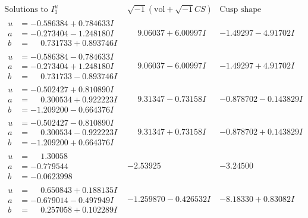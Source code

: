 \documentclass[1p]{elsarticle_modified}
\theoremstyle{definition}
\newcommand{\I}{\sqrt{-1}}
\begin{document}
$$\begin{array}{c|c|c}  
\text{Solutions to }I^u_{1}& \I (\text{vol} + \sqrt{-1}CS) & \text{Cusp shape}\\
 \hline 
\begin{aligned}
u &= -0.586384 + 0.784633 I \\
a &= -0.273404 - 1.248180 I \\
b &= \phantom{-}0.731733 + 0.893746 I\end{aligned}
 & \phantom{-}9.06037 + 6.00997 I & -1.49297 - 4.91702 I \\ \hline\begin{aligned}
u &= -0.586384 - 0.784633 I \\
a &= -0.273404 + 1.248180 I \\
b &= \phantom{-}0.731733 - 0.893746 I\end{aligned}
 & \phantom{-}9.06037 - 6.00997 I & -1.49297 + 4.91702 I \\ \hline\begin{aligned}
u &= -0.502427 + 0.810890 I \\
a &= \phantom{-}0.300534 + 0.922223 I \\
b &= -1.209200 - 0.664376 I\end{aligned}
 & \phantom{-}9.31347 - 0.73158 I & -0.878702 - 0.143829 I \\ \hline\begin{aligned}
u &= -0.502427 - 0.810890 I \\
a &= \phantom{-}0.300534 - 0.922223 I \\
b &= -1.209200 + 0.664376 I\end{aligned}
 & \phantom{-}9.31347 + 0.73158 I & -0.878702 + 0.143829 I \\ \hline\begin{aligned}
u &= \phantom{-}1.30058\phantom{ +0.000000I} \\
a &= -0.779544\phantom{ +0.000000I} \\
b &= -0.0623998\phantom{ +0.000000I}\end{aligned}
 & -2.53925\phantom{ +0.000000I} & -3.24500\phantom{ +0.000000I} \\ \hline\begin{aligned}
u &= \phantom{-}0.650843 + 0.188135 I \\
a &= -0.679014 - 0.497949 I \\
b &= \phantom{-}0.257058 + 0.102289 I\end{aligned}
 & -1.259870 - 0.426532 I & -8.18330 + 0.83082 I \\ \hline\begin{aligned}

\end{aligned}
\end{array}$$
\end{document}
